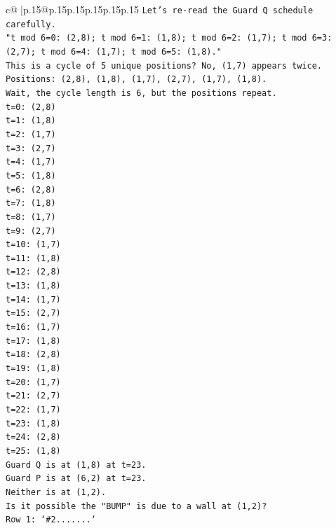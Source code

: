 \documentclass{article}
\begin{document}
{\begin{supertabular}{c@{$\;$}|p{.15\linewidth}@{}p{.15\linewidth}p{.15\linewidth}p{.15\linewidth}p{.15\linewidth}p{.15\linewidth}}
{{{\texttt{Let's re{-}read the Guard Q schedule carefully.} \\
\texttt{"t mod 6=0: (2,8); t mod 6=1: (1,8); t mod 6=2: (1,7); t mod 6=3: (2,7); t mod 6=4: (1,7); t mod 6=5: (1,8)."} \\
\texttt{This is a cycle of 5 unique positions? No, (1,7) appears twice.} \\
\texttt{Positions: (2,8), (1,8), (1,7), (2,7), (1,7), (1,8).} \\
\texttt{Wait, the cycle length is 6, but the positions repeat.} \\
\texttt{t=0: (2,8)} \\
\texttt{t=1: (1,8)} \\
\texttt{t=2: (1,7)} \\
\texttt{t=3: (2,7)} \\
\texttt{t=4: (1,7)} \\
\texttt{t=5: (1,8)} \\
\texttt{t=6: (2,8)} \\
\texttt{t=7: (1,8)} \\
\texttt{t=8: (1,7)} \\
\texttt{t=9: (2,7)} \\
\texttt{t=10: (1,7)} \\
\texttt{t=11: (1,8)} \\
\texttt{t=12: (2,8)} \\
\texttt{t=13: (1,8)} \\
\texttt{t=14: (1,7)} \\
\texttt{t=15: (2,7)} \\
\texttt{t=16: (1,7)} \\
\texttt{t=17: (1,8)} \\
\texttt{t=18: (2,8)} \\
\texttt{t=19: (1,8)} \\
\texttt{t=20: (1,7)} \\
\texttt{t=21: (2,7)} \\
\texttt{t=22: (1,7)} \\
\texttt{t=23: (1,8)} \\
\texttt{t=24: (2,8)} \\
\texttt{t=25: (1,8)} \\
\texttt{Guard Q is at (1,8) at t=23.} \\
\texttt{Guard P is at (6,2) at t=23.} \\
\texttt{Neither is at (1,2).} \\
\texttt{Is it possible the "BUMP" is due to a wall at (1,2)?} \\
\texttt{Row 1: `\#2.......`} \\
}}}
\end{supertabular}}
\end{document}
